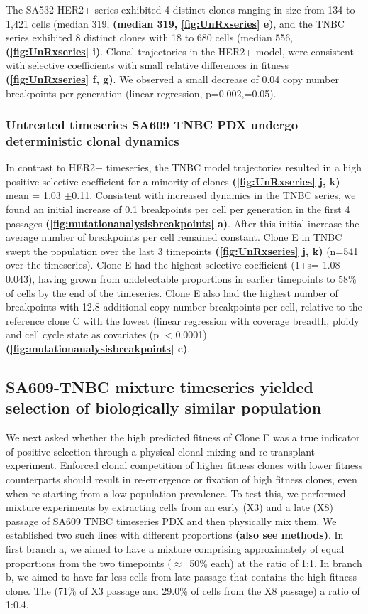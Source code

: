  The SA532 HER2+ series exhibited 4 distinct clones ranging in size from 134 to 1,421 cells (median 319, \textbf{(median 319, \autoref{fig:UnRxseries} e)}, and the TNBC series exhibited 8 distinct clones with 18 to 680 cells (median 556, \textbf{(\autoref{fig:UnRxseries} i)}. Clonal trajectories in the HER2+ model, were consistent with selective coefficients with small relative differences in fitness \textbf{(\autoref{fig:UnRxseries} f, g)}.
 We observed a small decrease of 0.04 copy number breakpoints per generation (linear regression, p=0.002,=0.05). 

\subsubsection{Untreated timeseries SA609 TNBC PDX undergo deterministic clonal dynamics}
In contrast to HER2+ timeseries, the TNBC model trajectories resulted in a high positive selective coefficient for a minority of clones \textbf{(\autoref{fig:UnRxseries} j, k)} mean = 1.03 $\pm $0.11. Consistent with increased dynamics in the TNBC series, we found an initial increase of 0.1 breakpoints per cell per generation in the first 4 passages \textbf{(\autoref{fig:mutationanalysisbreakpoints} a)}. After this initial increase the average number of breakpoints per cell remained constant.
 Clone E in TNBC swept the population over the last 3 timepoints \textbf{(\autoref{fig:UnRxseries} j, k)} (n=541 over the timeseries). Clone E had the highest selective coefficient (1+s= 1.08 $\pm $ 0.043), having grown from undetectable proportions in earlier timepoints to 58\% of cells by the end of the timeseries. Clone E also had the highest number of breakpoints with 12.8 additional copy number breakpoints per cell, relative to the reference clone C with the lowest (linear regression with coverage breadth, ploidy and cell cycle state as covariates (p $<$0.0001) \textbf{(\autoref{fig:mutationanalysisbreakpoints} c)}.


\subsection{SA609-TNBC mixture timeseries yielded selection of biologically similar population}
We next asked whether the high predicted fitness of Clone E was a true indicator of positive selection through a physical clonal mixing and re-transplant experiment. Enforced clonal competition of higher fitness clones with lower fitness counterparts should result in re-emergence or fixation of high fitness clones, even when re-starting from a low population prevalence. To test this, we performed mixture experiments by extracting cells from an early (X3) and a late (X8) passage of SA609 TNBC timeseries PDX and then physically mix them. We established two such lines with different proportions \textbf{(also see methods)}.
In first branch a, we aimed to have a mixture comprising approximately of equal proportions from the two timepoints ($\approx$~50\% each) at the ratio of 1:1. In branch b, we aimed to have far less cells from late passage that contains the high fitness clone. The (71\% of X3 passage and 29.0\% of cells from the X8 passage) a ratio of 1:0.4.


